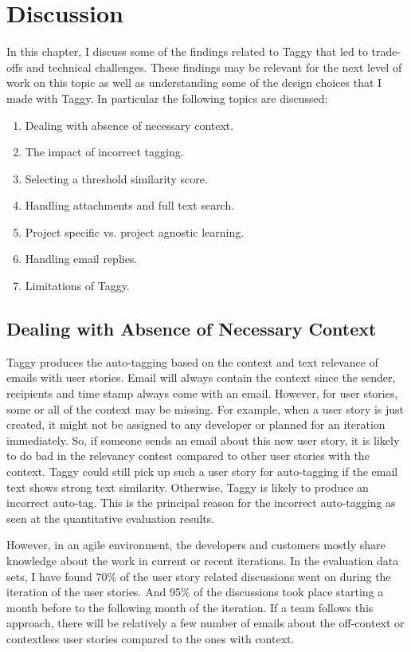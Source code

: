 \fancyhead[RO,LE]{\thepage}
\fancyfoot{} 
\chapter{Discussion}
\label{ch:discussion}
In this chapter, I discuss some of the findings related to Taggy that led to trade-offs and technical challenges. These findings may be relevant for the next level of work on this topic as well as understanding some of the design choices that I made with Taggy. In particular the following topics are discussed:

\begin{enumerate}
	\item Dealing with absence of necessary context.
	\item The impact of incorrect tagging.
	\item Selecting a threshold similarity score.	
	\item Handling attachments and full text search.	
	\item Project specific vs. project agnostic learning.
	\item Handling email replies.
	\item Limitations of Taggy.
\end{enumerate}

\section{Dealing with Absence of Necessary Context}
Taggy produces the auto-tagging based on the context and text relevance of emails with user stories. Email will always contain the context since the sender, recipients and time stamp always come with an email. However, for user stories, some or all of the context may be missing. For example, when a user story is just created, it might not be assigned to any developer or planned for an iteration immediately. So, if someone sends an email about this new user story, it is likely to do bad in the relevancy contest compared to other user stories with the context. Taggy could still pick up such  a user story for auto-tagging if the email text shows strong text similarity. Otherwise, Taggy is likely to produce an incorrect auto-tag. This is the principal reason for the incorrect auto-tagging as seen at the quantitative evaluation results.

However, in an agile environment, the developers and customers mostly share knowledge about the work in current or recent iterations. In the evaluation data sets, I have found 70\% of the user story related discussions went on during the iteration of the user stories. And 95\% of the discussions took place starting a month before to the following month of the iteration. If a team follows this approach, there will be relatively a few number of emails about the off-context or contextless user stories compared to the ones with context.


